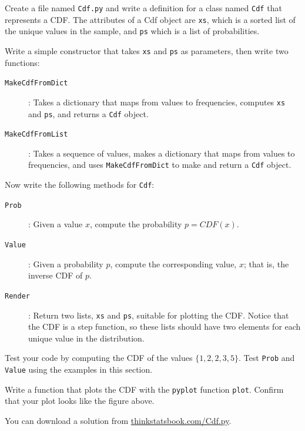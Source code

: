 \documentclass[12pt]{book}
\begin{document}
\begin{ex}
Create a file named {\tt Cdf.py} and write a definition for a class
named {\tt Cdf} that represents a CDF.  The attributes of a Cdf
object are {\tt xs}, which is a sorted list of the unique values
in the sample, and {\tt ps} which is a list of probabilities.

Write a simple constructor that takes {\tt xs} and {\tt ps} as
parameters, then write two functions:

\begin{description}

\item[{\tt MakeCdfFromDict}]: Takes a dictionary that maps from
values to frequencies, computes {\tt xs} and {\tt ps}, and returns
a {\tt Cdf} object.

\item[{\tt MakeCdfFromList}]: Takes a sequence of values, makes
a dictionary that maps from values to frequencies, and uses
{\tt MakeCdfFromDict} to make and return a {\tt Cdf} object.

\end{description}

Now write the following methods for {\tt Cdf}:

\begin{description}

\item[{\tt Prob}]: Given a value $x$, compute the probability $p = CDF(x)$.

\item[{\tt Value}]: Given a probability $p$, compute the
corresponding value, $x$; that is, the inverse CDF of $p$.

\item[{\tt Render}]: Return two lists, {\tt xs} and {\tt ps}, suitable
for plotting the CDF.  Notice that the CDF is a step function, so these
lists should have two elements for each unique value in the distribution.

\end{description}

Test your code by computing the CDF of the values $\{1, 2, 2, 3, 5\}$.
Test {\tt Prob} and {\tt Value} using the examples in this section.

Write a function that plots the CDF with the {\tt pyplot} function
{\tt plot}.  Confirm that your plot looks like the figure above.

You can download a solution from \url{thinkstatsbook.com/Cdf.py}.
\end{ex}
\end{document}
